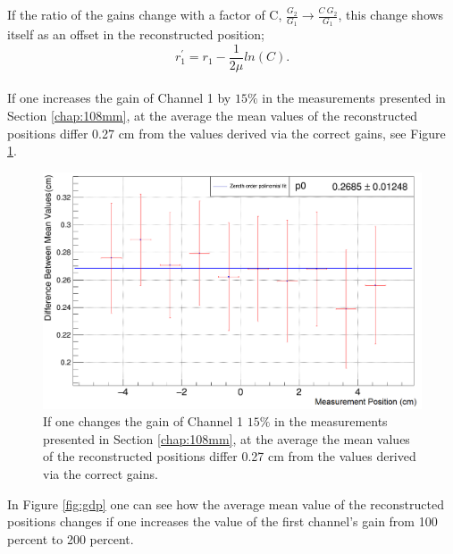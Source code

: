\documentclass[a4paper]{article}\linespread{1.4}
\begin{document}
If the ratio of the gains change with a factor of C, $\frac{G_{2}}{G_{1}} \to \frac{C\ G_{2}}{G_{1}}$, this change shows itself as an offset in the reconstructed position;
\begin{equation}r_{1}^{'}=r_{1} - \frac{1}{2\mu} ln(C) . \end{equation}
\\If one increases the gain of Channel 1 by $15\%$ in the measurements presented in Section \ref{chap:108mm}, at the average the mean values of the reconstructed positions differ 0.27 cm from the values derived via the correct gains, see Figure \ref{fig:gd}.
\begin{figure}[] \hspace*{-1cm} \includegraphics[width=130mm,scale=1.0]{gd.png} \caption{If one changes the gain of Channel 1 $15\%$ in the measurements presented in Section \ref{chap:108mm}, at the average the mean values of the reconstructed positions differ 0.27 cm from the values derived via the correct gains.} \label{fig:gd} \end{figure}  
In Figure \ref{fig:gdp} one can see how the average mean value of the reconstructed positions changes if one increases the value of the first channel's gain from 100 percent to 200 percent.
\end{document}
